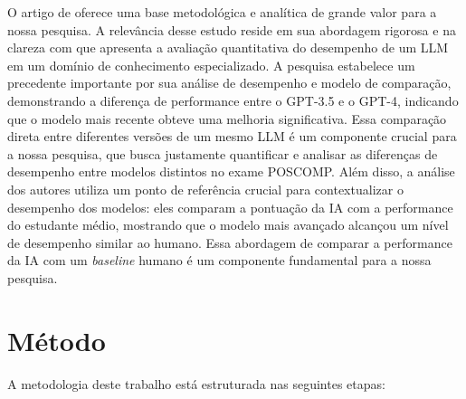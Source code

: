 \documentclass[brazilian, spanish, english]{RBIEarticle}
\begin{document}

O artigo de \parencite{bordt2023chatgptparticipatescomputerscience} oferece uma base metodológica e analítica de grande valor para a nossa pesquisa. A relevância desse estudo reside em sua abordagem rigorosa e na clareza com que apresenta a avaliação quantitativa do desempenho de um LLM em um domínio de conhecimento especializado. A pesquisa estabelece um precedente importante por sua análise de desempenho e modelo de comparação, demonstrando a diferença de performance entre o GPT-3.5 e o GPT-4, indicando que o modelo mais recente obteve uma melhoria significativa. Essa comparação direta entre diferentes versões de um mesmo LLM é um componente crucial para a nossa pesquisa, que busca justamente quantificar e analisar as diferenças de desempenho entre modelos distintos no exame POSCOMP. Além disso, a análise dos autores utiliza um ponto de referência crucial para contextualizar o desempenho dos modelos: eles comparam a pontuação da IA com a performance do estudante médio, mostrando que o modelo mais avançado alcançou um nível de desempenho similar ao humano. Essa abordagem de comparar a performance da IA com um \textit{baseline} humano é um componente fundamental para a nossa pesquisa.

\section{Método}

A metodologia deste trabalho está estruturada nas seguintes etapas:
\end{document}
